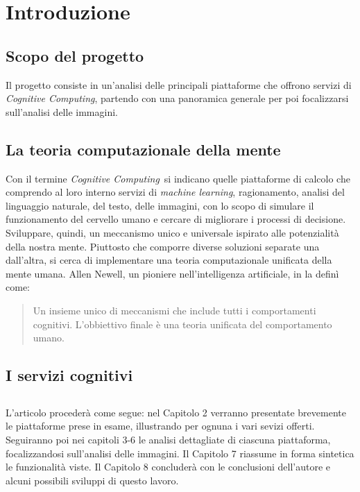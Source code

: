 \section{Introduzione}

\subsection{Scopo del progetto}
Il progetto consiste in un'analisi delle principali piattaforme che offrono servizi di \textit{Cognitive Computing},
partendo con una panoramica generale per poi focalizzarsi sull'analisi delle immagini.

\subsection{La teoria computazionale della mente}
Con il termine \textit{Cognitive Computing} si indicano quelle piattaforme di calcolo che comprendo al loro interno servizi
di \textit{machine learning}, ragionamento, analisi del linguaggio naturale, del testo, delle immagini, con lo scopo di simulare
il funzionamento del cervello umano e cercare di migliorare i processi di decisione.
Sviluppare, quindi, un meccanismo unico e universale ispirato alle potenzialità della nostra mente.
Piuttosto che comporre diverse soluzioni separate una dall'altra, si cerca di implementare una teoria computazionale unificata della mente umana.
Allen Newell, un pioniere nell'intelligenza artificiale, in \cite{newell92} la definì come:
\begin{quote}
Un insieme unico di meccanismi che include tutti i comportamenti cognitivi. L'obbiettivo finale è una teoria unificata del comportamento umano.
\end{quote}

\subsection{I servizi cognitivi}

\subsection*{}
L'articolo procederà come segue: nel Capitolo 2 verranno presentate brevemente le piattaforme prese in esame, illustrando per ognuna i vari sevizi offerti.
Seguiranno poi nei capitoli 3-6 le analisi dettagliate di ciascuna piattaforma, focalizzandosi sull'analisi delle immagini.
Il Capitolo 7 riassume in forma sintetica le funzionalità viste.
Il Capitolo 8 concluderà con le conclusioni dell'autore e alcuni possibili sviluppi di questo lavoro.
